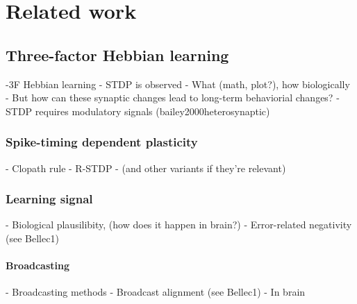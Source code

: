 \chapter{Related work}\label{ch:relatedwork}

\section{Three-factor Hebbian learning}
    \begin{tcolorbox}[colback=orange]
    -3F Hebbian learning
      - STDP is observed
        - What (math, plot?), how biologically
      - But how can these synaptic changes lead to long-term behaviorial changes?
      - STDP requires modulatory signals (bailey2000heterosynaptic)

    \vspace{6cm}
    \end{tcolorbox}

    \subsection{Spike-timing dependent plasticity}
        \begin{tcolorbox}[colback=orange]
        - Clopath rule
        - R-STDP
        - (and other variants if they're relevant)

        \vspace{10cm}

        \end{tcolorbox}


    \subsection{Learning signal}
        \begin{tcolorbox}[colback=orange]
        - Biological plausilibity, (how does it happen in brain?)
        - Error-related negativity (see Bellec1)
        \vspace{10cm}

        \end{tcolorbox}

        \subsubsection{Broadcasting}

            \begin{tcolorbox}[colback=orange]
            - Broadcasting methods
              - Broadcast alignment (see Bellec1)
              - In brain
            \vspace{6cm}

            \end{tcolorbox}


